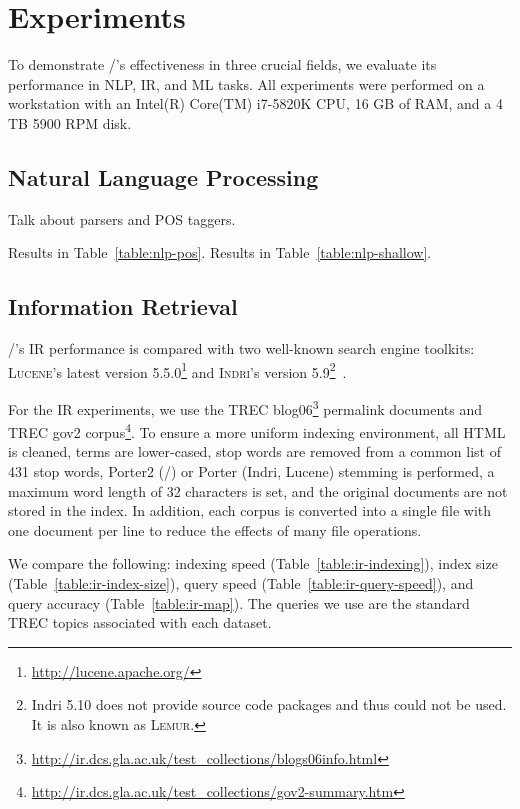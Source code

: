 \section{Experiments}
\label{sec:experiments}

To demonstrate \meta/'s effectiveness in three crucial fields, we evaluate its
performance in NLP, IR, and ML tasks. All experiments were performed on a
workstation with an Intel(R) Core(TM) i7-5820K CPU, 16 GB of RAM, and a 4
TB 5900 RPM disk.

\subsection{Natural Language Processing}

Talk about parsers and POS taggers.

Results in Table~\ref{table:nlp-pos}.
Results in Table~\ref{table:nlp-shallow}.





\subsection{Information Retrieval}

\meta/'s IR performance is compared with two well-known search engine toolkits:
\textsc{Lucene}'s latest version 5.5.0\footnote{\url{http://lucene.apache.org/}} and
\textsc{Indri}'s version 5.9\footnote{Indri 5.10 does not provide source
    code packages and thus could not be used. It is also known as
\textsc{Lemur}.}~\cite{lemur}.

For the IR experiments, we use the TREC
blog06\footnote{\url{http://ir.dcs.gla.ac.uk/test_collections/blogs06info.html}}
permalink documents and TREC gov2
corpus\footnote{\url{http://ir.dcs.gla.ac.uk/test_collections/gov2-summary.htm}}.
 To
ensure a more uniform indexing environment, all HTML is cleaned, terms are
lower-cased, stop words are removed from a common list of 431 stop words,
Porter2 (\meta/) or Porter (Indri, Lucene) stemming is performed, a maximum word
length of 32 characters is set, and the original documents are not stored in the
index. In addition, each corpus is converted into a single file with one
document per line to reduce the effects of many file operations.

We compare the following: indexing speed (Table~\ref{table:ir-indexing}), index
size (Table~\ref{table:ir-index-size}), query speed
(Table~\ref{table:ir-query-speed}), and query accuracy
(Table~\ref{table:ir-map}). The queries we use are the standard TREC topics
associated with each dataset.

